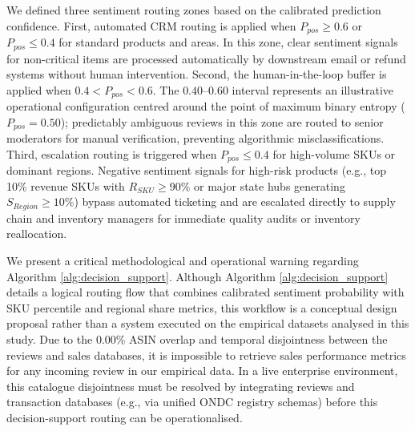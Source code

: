 \documentclass[authoryear,review,3p,times,12pt]{elsarticle}
\begin{document}
We defined three sentiment routing zones based on the calibrated prediction confidence. First, automated CRM routing is applied when $P_{pos} \ge 0.6$ or $P_{pos} \le 0.4$ for standard products and areas. In this zone, clear sentiment signals for non-critical items are processed automatically by downstream email or refund systems without human intervention. Second, the human-in-the-loop buffer is applied when $0.4 < P_{pos} < 0.6$. The $0.40$--$0.60$ interval represents an illustrative operational configuration centred around the point of maximum binary entropy ($P_{pos} = 0.50$); predictably ambiguous reviews in this zone are routed to senior moderators for manual verification, preventing algorithmic misclassifications. Third, escalation routing is triggered when $P_{pos} \le 0.4$ for high-volume SKUs or dominant regions. Negative sentiment signals for high-risk products (e.g., top 10\% revenue SKUs with $R_{SKU} \ge 90\%$ or major state hubs generating $S_{Region} \ge 10\%$) bypass automated ticketing and are escalated directly to supply chain and inventory managers for immediate quality audits or inventory reallocation.

We present a critical methodological and operational warning regarding Algorithm \ref{alg:decision_support}. Although Algorithm \ref{alg:decision_support} details a logical routing flow that combines calibrated sentiment probability with SKU percentile and regional share metrics, this workflow is a conceptual design proposal rather than a system executed on the empirical datasets analysed in this study. Due to the 0.00\% ASIN overlap and temporal disjointness between the reviews and sales databases, it is impossible to retrieve sales performance metrics for any incoming review in our empirical data. In a live enterprise environment, this catalogue disjointness must be resolved by integrating reviews and transaction databases (e.g., via unified ONDC registry schemas) before this decision-support routing can be operationalised.
\end{document}
